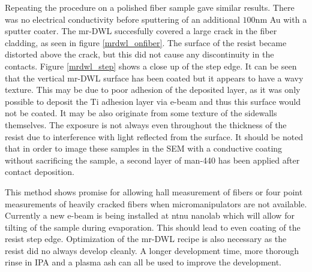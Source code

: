  Repeating the procedure on a polished fiber sample gave similar results. There was no electrical conductivity before sputtering of an additional $100 \si{\nano\meter}$ Au with a sputter coater. The mr-DWL succesfully covered a large crack in the fiber cladding, as seen in figure \ref{mrdwl_onfiber}. The surface of the resist became distorted above the crack, but this did not cause any discontinuity in the contacts. Figure \ref{mrdwl_step} shows a close up of the step edge.  It can be seen that the vertical mr-DWL surface has been coated but it appears to have a wavy texture. This may be due to poor adhesion of the deposited layer, as it was only possible to deposit the Ti adhesion layer via e-beam and thus this surface would not be coated. It may be also originate from some texture of the sidewalls themselves. The exposure is not always even throughout the thickness of the resist due to interference with light reflected from the surface. It should be noted that in order to image these samples in the SEM with a conductive coating without sacrificing the sample, a second layer of man-440 has been applied after contact deposition. 
 
This method shows promise for allowing hall measurement of fibers or four point measurements of heavily cracked fibers when micromanipulators are not available. Currently a new e-beam is being installed at ntnu nanolab which will allow for tilting of the sample during evaporation. This should lead to even coating of the resist step edge. Optimization of the mr-DWL recipe is also necessary as the resist did no always develop cleanly. A longer development time, more thorough rinse in IPA and a plasma ash can all be used to improve the development.

 








 
  
